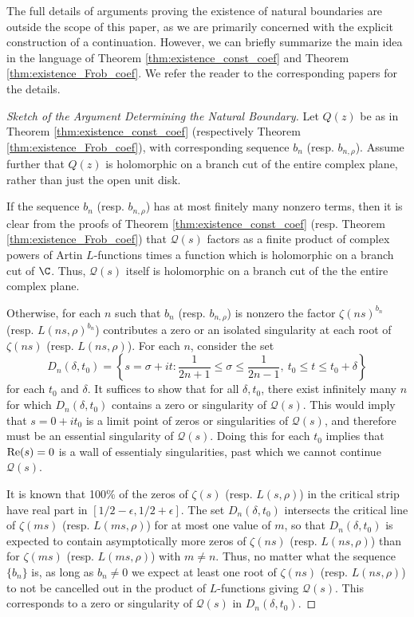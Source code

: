 \documentclass[12pt]{amsart}
\theoremstyle{plain}
\begin{document}
The full details of arguments proving the existence of natural boundaries are outside the scope of this paper, as we are primarily concerned with the explicit construction of a continuation. However, we can briefly summarize the main idea in the language of Theorem \ref{thm:existence_const_coef} and Theorem \ref{thm:existence_Frob_coef}. We refer the reader to the corresponding papers \cite{estermann_1928,dahlquist_1952,kurokawa_1978,kurokawa_1986I,kurokawa_1986II,moroz_1988} for the details.

\begin{proof}[Sketch of the Argument Determining the Natural Boundary]
    Let $Q(z)$ be as in Theorem \ref{thm:existence_const_coef} (respectively Theorem \ref{thm:existence_Frob_coef}), with corresponding sequence $b_n$ (resp. $b_{n,\rho}$). Assume further that $Q(z)$ is holomorphic on a branch cut of the entire complex plane, rather than just the open unit disk.

    If the sequence $b_n$ (resp. $b_{n,\rho}$) has at most finitely many nonzero terms, then it is clear from the proofs of Theorem \ref{thm:existence_const_coef} (resp. Theorem \ref{thm:existence_Frob_coef}) that $\mathcal{Q}(s)$ factors as a finite product of complex powers of Artin $L$-functions times a function which is holomorphic on a branch cut of $\C$. Thus, $\mathcal{Q}(s)$ itself is holomorphic on a branch cut of the the entire complex plane.

    Otherwise, for each $n$ such that $b_n$ (resp. $b_{n,\rho}$) is nonzero the factor $\zeta(ns)^{b_n}$ (resp. $L(ns,\rho)^{b_n}$) contributes a zero or an isolated singularity at each root of $\zeta(ns)$ (resp. $L(ns,\rho)$). For each $n$, consider the set
    \[
        D_n(\delta,t_0) = \left\{s=\sigma+it : \frac{1}{2n+1}\le \sigma \le \frac{1}{2n-1},\ t_0\le t\le t_0+\delta\right\}
    \]
    for each $t_0$ and $\delta$. It suffices to show that for all $\delta,t_0$, there exist infinitely many $n$ for which $D_n(\delta,t_0)$ contains a zero or singularity of $\mathcal{Q}(s)$. This would imply that $s = 0 + it_0$ is a limit point of zeros or singularities of $\mathcal{Q}(s)$, and therefore must be an essential singularity of $\mathcal{Q}(s)$. Doing this for each $t_0$ implies that ${\rm Re}(s) = 0$ is a wall of essentialy singularities, past which we cannot continue $\mathcal{Q}(s)$.

    It is known that 100\% of the zeros of $\zeta(s)$ (resp. $L(s,\rho)$) in the critical strip have real part in $[1/2-\epsilon,1/2+\epsilon]$. The set $D_n(\delta,t_0)$ intersects the critical line of $\zeta(ms)$ (resp. $L(ms,\rho)$) for at most one value of $m$, so that $D_n(\delta,t_0)$ is expected to contain asymptotically more zeros of $\zeta(ns)$ (resp. $L(ns,\rho)$) than for $\zeta(ms)$ (resp. $L(ms,\rho)$) with $m\ne n$. Thus, no matter what the sequence $\{b_n\}$ is, as long as $b_n\ne 0$ we expect at least one root of $\zeta(ns)$ (resp. $L(ns,\rho)$) to not be cancelled out in the product of $L$-functions giving $\mathcal{Q}(s)$. This corresponds to a zero or singularity of $\mathcal{Q}(s)$ in $D_n(\delta,t_0)$.


\end{proof}
\end{document}
